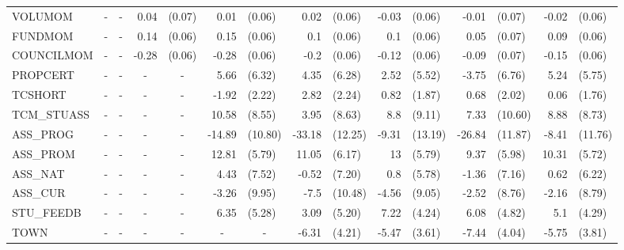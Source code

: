\documentclass[10pt]{article}
\begin{document}
\begin{table}[htbp]
\begin{tabular}{lrlrlrlrlrlrlrl}
 VOLUMOM & \multicolumn{1}{c}{-} & \multicolumn{1}{c}{-} & 0.04  & (0.07) & 0.01  & (0.06) & 0.02  & (0.06) & -0.03 & (0.06) & -0.01 & (0.07) & -0.02 & (0.06) \\[0.2em]
 FUNDMOM & \multicolumn{1}{c}{-} & \multicolumn{1}{c}{-} & 0.14  & (0.06) & 0.15  & (0.06) & 0.1   & (0.06) & 0.1   & (0.06) & 0.05  & (0.07) & 0.09  & (0.06) \\[0.2em]
 COUNCILMOM & \multicolumn{1}{c}{-} & \multicolumn{1}{c}{-} & -0.28 & (0.06) & -0.28 & (0.06) & -0.2  & (0.06) & -0.12 & (0.06) & -0.09 & (0.07) & -0.15 & (0.06) \\[0.2em]
 PROPCERT & \multicolumn{1}{c}{-} & \multicolumn{1}{c}{-} & \multicolumn{1}{c}{-} & \multicolumn{1}{c}{-} & 5.66  & (6.32) & 4.35  & (6.28) & 2.52  & (5.52) & -3.75 & (6.76) & 5.24  & (5.75) \\[0.2em]
 TCSHORT & \multicolumn{1}{c}{-} & \multicolumn{1}{c}{-} & \multicolumn{1}{c}{-} & \multicolumn{1}{c}{-} & -1.92 & (2.22) & 2.82  & (2.24) & 0.82  & (1.87) & 0.68  & (2.02) & 0.06  & (1.76) \\[0.2em]
 TCM\_STUASS & \multicolumn{1}{c}{-} & \multicolumn{1}{c}{-} & \multicolumn{1}{c}{-} & \multicolumn{1}{c}{-} & 10.58 & (8.55) & 3.95  & (8.63) & 8.8   & (9.11) & 7.33  & (10.60) & 8.88  & (8.73) \\[0.2em]
 ASS\_PROG & \multicolumn{1}{c}{-} & \multicolumn{1}{c}{-} & \multicolumn{1}{c}{-} & \multicolumn{1}{c}{-} & -14.89 & (10.80) & -33.18 & (12.25) & -9.31 & (13.19) & -26.84 & (11.87) & -8.41 & (11.76) \\[0.2em]
 ASS\_PROM & \multicolumn{1}{c}{-} & \multicolumn{1}{c}{-} & \multicolumn{1}{c}{-} & \multicolumn{1}{c}{-} & 12.81 & (5.79) & 11.05 & (6.17) & 13    & (5.79) & 9.37  & (5.98) & 10.31 & (5.72) \\[0.2em]
 ASS\_NAT & \multicolumn{1}{c}{-} & \multicolumn{1}{c}{-} & \multicolumn{1}{c}{-} & \multicolumn{1}{c}{-} & 4.43  & (7.52) & -0.52 & (7.20) & 0.8   & (5.78) & -1.36 & (7.16) & 0.62  & (6.22) \\[0.2em]
 ASS\_CUR & \multicolumn{1}{c}{-} & \multicolumn{1}{c}{-} & \multicolumn{1}{c}{-} & \multicolumn{1}{c}{-} & -3.26 & (9.95) & -7.5  & (10.48) & -4.56 & (9.05) & -2.52 & (8.76) & -2.16 & (8.79) \\[0.2em]
 STU\_FEEDB & \multicolumn{1}{c}{-} & \multicolumn{1}{c}{-} & \multicolumn{1}{c}{-} & \multicolumn{1}{c}{-} & 6.35  & (5.28) & 3.09  & (5.20) & 7.22  & (4.24) & 6.08  & (4.82) & 5.1   & (4.29) \\[0.2em]
 TOWN  & \multicolumn{1}{c}{-} & \multicolumn{1}{c}{-} & \multicolumn{1}{c}{-} & \multicolumn{1}{c}{-} & \multicolumn{1}{c}{-} & \multicolumn{1}{c}{-} & -6.31 & (4.21) & -5.47 & (3.61) & -7.44 & (4.04) & -5.75 & (3.81) \\[0.2em]

\end{tabular}
\end{table}
\end{document}

